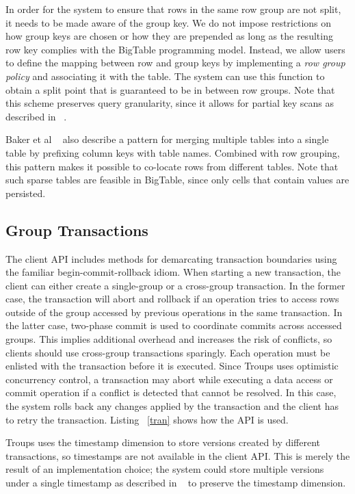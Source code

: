 \documentclass[10pt,final,journal]{IEEEtran}
\begin{document}
In order for the system to ensure that rows in the same row group are not split, it needs to be made aware of the group key. We do not impose restrictions on how group keys are chosen or how they are prepended as long as the resulting row key complies with the BigTable programming model. Instead, we allow users to define the mapping between row and group keys by implementing a \emph{row group policy} and associating it with the table. The system can use this function to obtain a split point that is guaranteed to be in between row groups. Note that this scheme preserves query granularity, since it allows for partial key scans as described in ~\cite{George:2011}.

Baker et al ~\cite{Baker:2011:8530095} also describe a pattern for merging multiple tables into a single table by prefixing column keys with table names. Combined with row grouping, this pattern makes it possible to co-locate rows from different tables. Note that such sparse tables are feasible in BigTable, since only cells that contain values are persisted.

\subsection{Group Transactions}
The client API includes methods for demarcating transaction boundaries using the familiar begin-commit-rollback idiom. When starting a new transaction, the client can either create a single-group or a cross-group transaction. In the former case, the transaction will abort and rollback if an operation tries to access rows outside of the group accessed by previous operations in the same transaction. In the latter case, two-phase commit is used to coordinate commits across accessed groups. This implies additional overhead and increases the risk of conflicts, so clients should use cross-group transactions sparingly. Each operation must be enlisted with the transaction before it is executed. Since Troups uses optimistic concurrency control, a transaction may abort while executing a data access or commit operation if a conflict is detected that cannot be resolved. In this case, the system rolls back any changes applied by the transaction and the client has to retry the transaction. Listing ~\ref{tran} shows how the API is used.

Troups uses the timestamp dimension to store versions created by different transactions, so timestamps are not available in the client API. This is merely the result of an implementation choice; the system could store multiple versions under a single timestamp as described in ~\cite{Peng:2010:LIP:1924943.1924961} to preserve the timestamp dimension.
\end{document}
